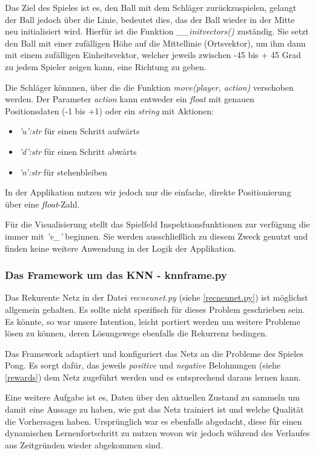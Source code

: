 \documentclass[12pt,twoside]{article}
\theoremstyle{plain}
\theoremstyle{definition}
\theoremstyle{remark}
\begin{document}
Das Ziel des Spieles ist es, den Ball mit dem Schläger zurückzuspielen, gelangt der Ball jedoch über die Linie, bedeutet dies, das der Ball wieder in der Mitte neu initialisiert wird. Hierfür ist die Funktion \textit{\_\_initvectors()} zuständig. Sie setzt den Ball mit einer zufälligen Höhe auf die Mittellinie (Ortsvektor), um ihm dann mit einem zufälligen Einheitsvektor, welcher jeweils zwischen -45 bis + 45 Grad zu jedem Spieler zeigen kann, eine Richtung zu geben.

Die Schläger könnnen, über die die Funktion \textit{move(player, action)} verschoben werden. Der Parameter \textit{action} kann entweder ein \textit{float} mit genauen Positionsdaten (-1 bis +1) oder ein \textit{string} mit Aktionen:
\begin{itemize}
  \item \textit{'u':str} für einen Schritt aufwärts 
  \item \textit{'d':str} für einen Schritt abwärts 
  \item \textit{'n':str} für stehenbleiben
\end{itemize}
In der Applikation nutzen wir jedoch nur die einfache, direkte Positionierung über eine \textit{float}-Zahl.

Für die Visualisierung stellt das Spielfeld Inspektionsfunktionen zur verfügung die immer mit \textit{'v\_'} beginnen. Sie werden ausschließlich zu diesem Zweck genutzt und finden keine weitere Anwendung in der Logik der Applikation.

\subsubsection{Das Framework um das KNN - knnframe.py}
\label{knnframe.py}

Das Rekurente Netz in der Datei \textit{recneunet.py} (siehe \ref{recneunet.py}) ist möglichst allgemein gehalten. Es sollte nicht spezifisch für dieses Problem geschrieben sein. Es könnte, so war unsere Intention, leicht portiert werden um weitere Probleme lösen zu können, deren Lösungswege ebenfalls die Rekurrenz bedingen.

Das Framework adaptiert und konfiguriert das Netz an die Probleme des Spieles Pong. Es sorgt dafür, das jeweils \textit{positive} und \textit{negative} Belohnungen (siehe \ref{rewards}) dem Netz zugeführt werden und es entsprechend daraus lernen kann.

Eine weitere Aufgabe ist es, Daten über den aktuellen Zustand zu sammeln um damit eine Aussage zu haben, wie gut das Netz trainiert ist und welche Qualität die Vorhersagen haben. Ursprünglich war es ebenfalls abgedacht, diese für einen dynamischen Lernenfortschritt zu nutzen wovon wir jedoch während des Verlaufes aus Zeitgründen wieder abgekommen sind. 
\end{document}
